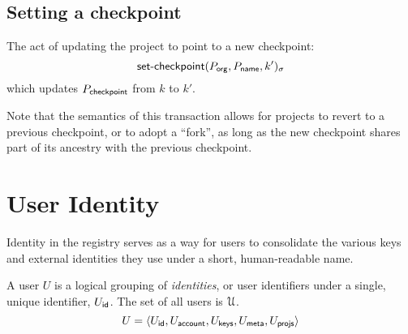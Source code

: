 \subsection{Setting a checkpoint}
The act of updating the project to point to a new checkpoint:
\[
    \operatorname{\mathsf{set-checkpoint}}\lparen P_{\mathsf{org}}, P_{\mathsf{name}}, k'\rparen_\sigma
\]
which updates $P_{\mathsf{checkpoint}}$ from $k$ to $k'$.

Note that the semantics of this transaction allows for projects to revert to
a previous checkpoint, or to adopt a ``fork'', as long as the new checkpoint
shares part of its ancestry with the previous checkpoint.

\section{User Identity}

Identity in the registry serves as a way for users to consolidate the various
keys and external identities they use under a short, human-readable name.

A user $U$ is a logical grouping of {\em identities}, or user identifiers under a
single, unique identifier, $U_{\mathsf{id}}$. The set of all users is $\mathcal{U}$.
\[
    U = \langle U_{\mathsf{id}}, U_{\mathsf{account}}, U_{\mathsf{keys}}, U_{\mathsf{meta}}, U_{\mathsf{projs}}\rangle
\]

